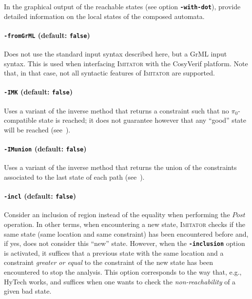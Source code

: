 \documentclass[a4paper,11pt]{article}
\newcommand{\pio}{\pi_0}
\newcommand{\hytech}{{\sc HyTech}}
\newcommand{\imitator}{\textsc{Imitator}}
\newcommand{\code}[1]{\textbf{\texttt{#1}}}
\begin{document}
In the graphical output of the reachable states (see option \code{-with-dot}), 
provide detailed information on the local states of the composed automata.


\paragraph{\code{-fromGrML} (default: \code{false})}

Does not use the standard input syntax described here, but a GrML input syntax.
This is used when interfacing \imitator{} with the CosyVerif platform.
Note that, in that case, not all syntactic features of \imitator{} are supported.



\paragraph{\code{-IMK} (default: \code{false})}
Uses a variant of the inverse method that returns a constraint such that no $\pio$-compatible state is reached; it does not guarantee however that any ``good'' state will be reached (see~\cite{AS13}).



\paragraph{\code{-IMunion} (default: \code{false})}
Uses a variant of the inverse method that returns the union of the constraints associated to the last state of each path (see~\cite{AS13}).


\paragraph{\code{-incl} (default: \code{false})}
Consider an inclusion of region instead of the equality when performing the $\textit{Post}$ operation.
In other terms, when encountering a new state, \imitator{} checks if the same state (same location and same constraint) has been encountered before and, if yes, does not consider this ``new'' state.
However, when the \code{-inclusion} option is activated, it suffices that a previous state with the same location and a constraint \emph{greater or equal} to the constraint of the new state has been encountered to stop the analysis.
This option corresponds to the way that, e.g., \hytech{} works, and suffices when one wants to check the \emph{non-reachability} of a given bad state.
\end{document}
